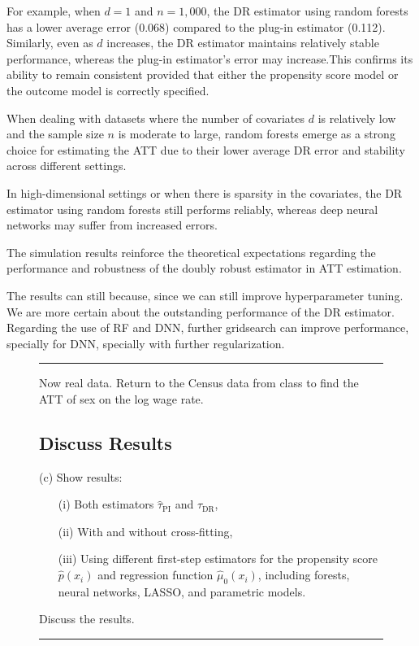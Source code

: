 \documentclass{article}
\newenvironment{colorparagraph}[1]{\par\color{#1}}{\par}
\begin{document}
For example, when \( d = 1 \) and \( n = 1,000 \), the DR estimator using random forests has a lower average error (0.068) compared to the plug-in estimator (0.112). Similarly, even as \( d \) increases, the DR estimator maintains relatively stable performance, whereas the plug-in estimator's error may increase.This confirms its ability to remain consistent provided that either the propensity score model or the outcome model is correctly specified.

When dealing with datasets where the number of covariates \( d \) is relatively low and the sample size \( n \) is moderate to large, random forests emerge as a strong choice for estimating the ATT due to their lower average DR error and stability across different settings.

In high-dimensional settings or when there is sparsity in the covariates, the DR estimator using random forests still performs reliably, whereas deep neural networks may 
suffer from increased errors.

The simulation results reinforce the theoretical expectations regarding the performance and robustness of the doubly robust estimator in ATT estimation.

The results can still because, since we can still improve  hyperparameter tuning. We are more certain about the outstanding performance of the DR estimator. Regarding the use of RF and DNN, further gridsearch can improve performance, specially for DNN, specially with further regularization.

\begin{figure}[H]
  \begin{colorparagraph}{questioncolor}
  \rule{\textwidth}{0.5pt}

    Now real data. Return to the Census data from class to find the ATT of sex on the log wage rate.

  \label{q2c}
  \subsection{Discuss Results}
  (c) Show results:
  \begin{itemize}
      \item[(i)] Both estimators $\hat{\tau}_{\text{PI}}$ and $\hat{\tau}_{\text{DR}}$,
      \item[(ii)] With and without cross-fitting,
      \item[(iii)] Using different first-step estimators for the propensity score \( \hat{p}(x_i) \) and regression function \( \hat{\mu}_0(x_i) \), including forests, neural networks, LASSO, and parametric models.
  \end{itemize}

  Discuss the results.

  \rule{\textwidth}{0.5pt}
  \end{colorparagraph}
\end{figure}
\end{document}
